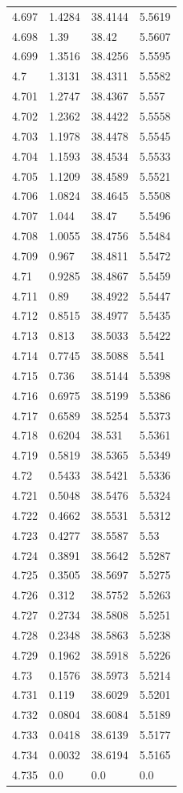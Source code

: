 \begin{tabular}{llll}
4.697 & 1.4284 & 38.4144 & 5.5619 \\
4.698 & 1.39 & 38.42 & 5.5607 \\
4.699 & 1.3516 & 38.4256 & 5.5595 \\
4.7 & 1.3131 & 38.4311 & 5.5582 \\
4.701 & 1.2747 & 38.4367 & 5.557 \\
4.702 & 1.2362 & 38.4422 & 5.5558 \\
4.703 & 1.1978 & 38.4478 & 5.5545 \\
4.704 & 1.1593 & 38.4534 & 5.5533 \\
4.705 & 1.1209 & 38.4589 & 5.5521 \\
4.706 & 1.0824 & 38.4645 & 5.5508 \\
4.707 & 1.044 & 38.47 & 5.5496 \\
4.708 & 1.0055 & 38.4756 & 5.5484 \\
4.709 & 0.967 & 38.4811 & 5.5472 \\
4.71 & 0.9285 & 38.4867 & 5.5459 \\
4.711 & 0.89 & 38.4922 & 5.5447 \\
4.712 & 0.8515 & 38.4977 & 5.5435 \\
4.713 & 0.813 & 38.5033 & 5.5422 \\
4.714 & 0.7745 & 38.5088 & 5.541 \\
4.715 & 0.736 & 38.5144 & 5.5398 \\
4.716 & 0.6975 & 38.5199 & 5.5386 \\
4.717 & 0.6589 & 38.5254 & 5.5373 \\
4.718 & 0.6204 & 38.531 & 5.5361 \\
4.719 & 0.5819 & 38.5365 & 5.5349 \\
4.72 & 0.5433 & 38.5421 & 5.5336 \\
4.721 & 0.5048 & 38.5476 & 5.5324 \\
4.722 & 0.4662 & 38.5531 & 5.5312 \\
4.723 & 0.4277 & 38.5587 & 5.53 \\
4.724 & 0.3891 & 38.5642 & 5.5287 \\
4.725 & 0.3505 & 38.5697 & 5.5275 \\
4.726 & 0.312 & 38.5752 & 5.5263 \\
4.727 & 0.2734 & 38.5808 & 5.5251 \\
4.728 & 0.2348 & 38.5863 & 5.5238 \\
4.729 & 0.1962 & 38.5918 & 5.5226 \\
4.73 & 0.1576 & 38.5973 & 5.5214 \\
4.731 & 0.119 & 38.6029 & 5.5201 \\
4.732 & 0.0804 & 38.6084 & 5.5189 \\
4.733 & 0.0418 & 38.6139 & 5.5177 \\
4.734 & 0.0032 & 38.6194 & 5.5165 \\
4.735 & 0.0 & 0.0 & 0.0 \\
\bottomrule
\end{tabular}
